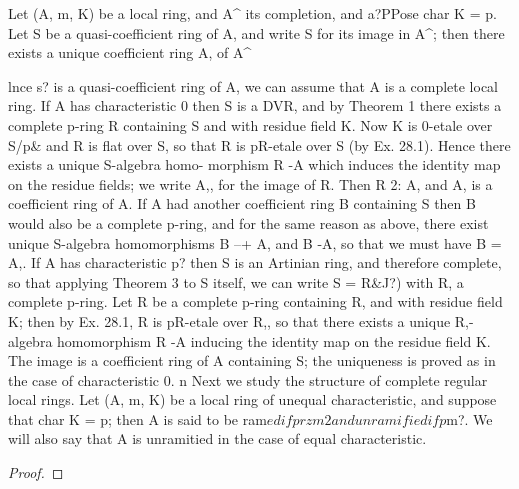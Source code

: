 \begin{theorem}[Theorem 29.6]\label{mcrt-auto-theorem-29-6}\uses{}
\begin{mathematicalrecord}
Let (A, m, K) be a local ring, and A^ its completion, and
     a?PPose char K = p. Let S be a quasi-coefficient ring of A, and write S
     for its image in A^; then there exists a unique coefficient ring A, of A^

             lnce s? is a quasi-coefficient    ring of A, we can assume that A is
a complete local ring. If A has characteristic 0 then S is a DVR, and by
Theorem 1 there exists a complete p-ring R containing S and with residue
field K. Now K is 0-etale over S/p& and R is flat over S, so that R is
pR-etale over S (by Ex. 28.1). Hence there exists a unique S-algebra homo-
morphism R -A           which induces the identity map on the residue
fields; we write A,, for the image of R. Then R 2: A, and A, is a coefficient
ring of A. If A had another coefficient ring B containing S then B would
also be a complete p-ring, and for the same reason as above, there exist
unique S-algebra homomorphisms        B --+ A, and B -A,      so that we must
have B = A,.
    If A has characteristic p? then S is an Artinian ring, and therefore
complete, so that applying Theorem 3 to S itself, we can write S = R&J?)
with R, a complete p-ring. Let R be a complete p-ring containing R, and
with residue field K; then by Ex. 28.1, R is pR-etale over R,, so that there
exists a unique R,-algebra homomorphism        R -A     inducing the identity
map on the residue field K. The image is a coefficient ring of A
containing S; the uniqueness is proved as in the case of characteristic 0. n
    Next we study the structure of complete regular local rings. Let (A, m, K)
be a local ring of unequal characteristic, and suppose that char K = p;
then A is said to be ram$ed if przm2 and unramified if p$m?. We will
also say that A is unramitied in the case of equal characteristic.
\end{mathematicalrecord}
\end{theorem}
\begin{proof}
\notready
\end{proof}


